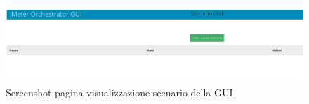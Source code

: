  \begin{figure}[H]
 	\centering
 	\includegraphics[width=\textwidth]{immagini/guihome}
 	\caption{Screenshot pagina visualizzazione scenario della GUI}
 	\label{img-guishow}
 \end{figure}
\newpage